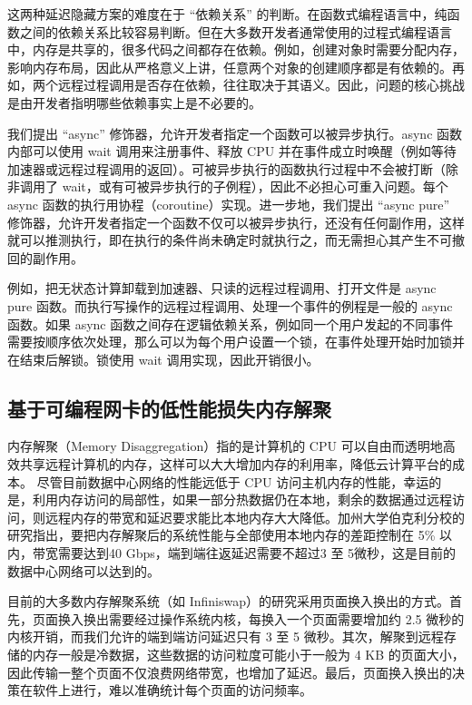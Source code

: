 这两种延迟隐藏方案的难度在于 ``依赖关系'' 的判断。在函数式编程语言中，纯函数之间的依赖关系比较容易判断。但在大多数开发者通常使用的过程式编程语言中，内存是共享的，很多代码之间都存在依赖。例如，创建对象时需要分配内存，影响内存布局，因此从严格意义上讲，任意两个对象的创建顺序都是有依赖的。再如，两个远程过程调用是否存在依赖，往往取决于其语义。因此，问题的核心挑战是由开发者指明哪些依赖事实上是不必要的。

我们提出 ``async'' 修饰器，允许开发者指定一个函数可以被异步执行。async 函数内部可以使用 wait 调用来注册事件、释放 CPU 并在事件成立时唤醒（例如等待加速器或远程过程调用的返回）。可被异步执行的函数执行过程中不会被打断（除非调用了 wait，或有可被异步执行的子例程），因此不必担心可重入问题。每个 async 函数的执行用协程（coroutine）实现。进一步地，我们提出 ``async pure'' 修饰器，允许开发者指定一个函数不仅可以被异步执行，还没有任何副作用，这样就可以推测执行，即在执行的条件尚未确定时就执行之，而无需担心其产生不可撤回的副作用。

例如，把无状态计算卸载到加速器、只读的远程过程调用、打开文件是 async pure 函数。而执行写操作的远程过程调用、处理一个事件的例程是一般的 async 函数。如果 async 函数之间存在逻辑依赖关系，例如同一个用户发起的不同事件需要按顺序依次处理，那么可以为每个用户设置一个锁，在事件处理开始时加锁并在结束后解锁。锁使用 wait 调用实现，因此开销很小。

\subsection{基于可编程网卡的低性能损失内存解聚}

内存解聚（Memory Disaggregation）指的是计算机的 CPU 可以自由而透明地高效共享远程计算机的内存，这样可以大大增加内存的利用率，降低云计算平台的成本。
尽管目前数据中心网络的性能远低于 CPU 访问主机内存的性能，幸运的是，利用内存访问的局部性，如果一部分热数据仍在本地，剩余的数据通过远程访问，则远程内存的带宽和延迟要求能比本地内存大大降低。加州大学伯克利分校的研究指出，要把内存解聚后的系统性能与全部使用本地内存的差距控制在 5\% 以内，带宽需要达到40 Gbps，端到端往返延迟需要不超过3 至 5微秒，这是目前的数据中心网络可以达到的。

目前的大多数内存解聚系统（如 Infiniswap）的研究采用页面换入换出的方式。首先，页面换入换出需要经过操作系统内核，每换入一个页面需要增加约 2.5 微秒的内核开销，而我们允许的端到端访问延迟只有 3 至 5 微秒。其次，解聚到远程存储的内存一般是冷数据，这些数据的访问粒度可能小于一般为 4 KB 的页面大小，因此传输一整个页面不仅浪费网络带宽，也增加了延迟。最后，页面换入换出的决策在软件上进行，难以准确统计每个页面的访问频率。

